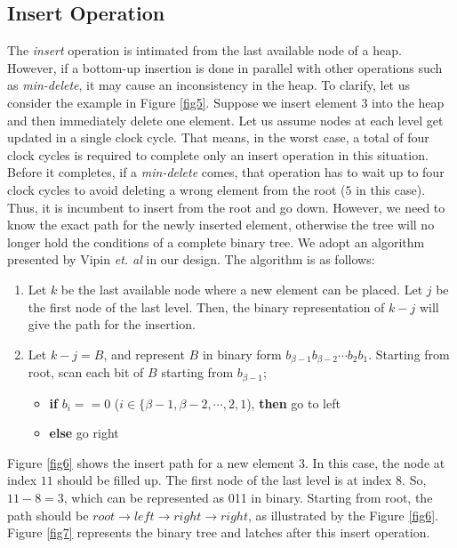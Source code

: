 \subsection{Insert Operation}

The {\it insert} operation is intimated from the last available node of a heap.
However, if a bottom-up insertion is done in parallel with other operations such as {\it min-delete}, it may cause an inconsistency in the heap.
To clarify, let us consider the example in Figure \ref{fig5}.
Suppose we insert element $3$ into the heap and then immediately delete one element.
Let us assume nodes at each level get updated in a single clock cycle.
That means, in the worst case, a total of four clock cycles is required to complete only an insert operation in this situation.
Before it completes, if a {\it min-delete} comes, that operation has to wait up to four clock cycles to avoid deleting a wrong element from the root ($5$ in this case).
Thus, it is incumbent to insert from the root and go down.
However, we need to know the exact path for the newly inserted element, otherwise the tree will no longer hold the conditions of a complete binary tree.
We adopt an algorithm presented by Vipin {\it et. al} \cite{pq6} in our design. The algorithm is as follows:

\begin{enumerate}
\item Let $k$ be the last available node where a new element can be placed. Let $j$ be the first node of the last level. Then, the binary representation of $k-j$ will give the path for the insertion.
\item Let $k-j = B$, and represent $B$ in binary form $b_{\beta-1}b_{\beta-2} \cdots b_2b_1$. Starting from root, scan each bit of $B$ starting from $b_{\beta-1}$;
    \begin{itemize}
    \item {\bf if} $b_i == 0$ ($i \in \{\beta-1,\beta-2, \cdots, 2,1$), {\bf then} go to left
    \item {\bf else} go right
    \end{itemize}
\end{enumerate}

Figure \ref{fig6} shows the insert path for a new element $3$. In this case, the node at index $11$ should be filled up.
The first node of the last level is at index $8$.
So, $11 - 8 = 3$, which can be represented as 011 in binary.
Starting from root, the path should be $root \rightarrow left \rightarrow right \rightarrow right$, as illustrated by the Figure \ref{fig6}. Figure \ref{fig7} represents the binary tree and latches after this insert operation.

